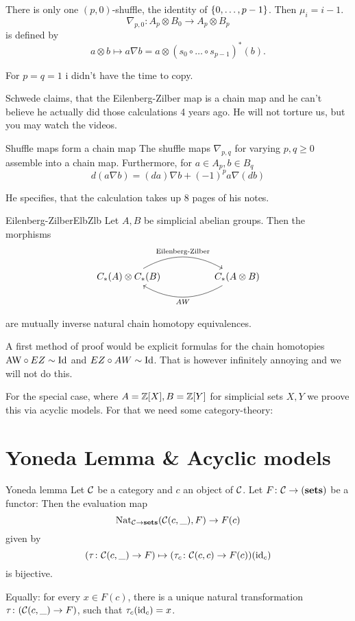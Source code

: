 \documentclass[language=english]{TemplateLecture}
\begin{document}
\begin{example}
    There is only one \((p,0)\)-shuffle, the identity of \(\{0, \dots, p-1\}\). Then \(\mu_i = i-1\).
    \[\nabla_{p,0}\colon A_p \otimes B_0 \to A_p \otimes B_p\]
    is defined by
    \[a\otimes b \mapsto a\nabla b = a \otimes (s_0 \circ \dots \circ s_{p-1})^*(b).\]

    For \(p = q = 1\) i didn't have the time to copy.
\end{example}

Schwede claims, that the Eilenberg-Zilber map is a chain map and he can't believe he actually did those calculations 4 years ago. He will not torture us, but you may watch the videos.

\begin{thm}{Shuffle maps form a chain map}{}
    The shuffle maps \(\nabla_{p,q}\) for varying \(p,q \geq 0\) assemble into a chain map. Furthermore, for \(a \in A_p, b \in B_q\)
    \[d(a\nabla b) = (da) \nabla b + (-1)^p a \nabla (db)\]
\end{thm}

He specifies, that the calculation takes up 8 pages of his notes.


\begin{thm}{Eilenberg-Zilber}{ElbZlb}
    Let \(A,B\) be simplicial abelian groups. Then the morphisms
    \[\begin{tikzcd}
        C_*(A) \otimes C_*(B) \ar[rr, bend left, "\text{Eilenberg-Zilber}"] && C_*(A\otimes B) \ar[ll, bend left, "AW"]
    \end{tikzcd}\]

    are mutually inverse natural chain homotopy equivalences.
\end{thm}

A first method of proof would be explicit formulas for the chain homotopies \(\text{AW} \circ EZ \sim \operatorname{Id}\) and \(EZ \circ AW \sim \operatorname{Id}\). That is however infinitely annoying and we will not do this.

For the special case, where \(A = \mathbb{Z}[X], B= \mathbb{Z}[Y]\) for simplicial sets \(X,Y\) we proove this via acyclic models. For that we need some category-theory:

\section{Yoneda Lemma \& Acyclic models}

\begin{thm}{Yoneda lemma}{}
    Let \(\mathcal{C}\) be a category and \(c\) an object of \(\mathcal{C}\). Let \(F\colon \mathcal{C} \to (\mathbf{sets})\) be a functor: Then the evaluation map
    \[\mathrm{Nat}_{\mathcal{C} \to \mathbf{sets}}(\mathcal{C}(c,\_), F) \to F(c)\]
    given by
    \[(\tau\colon \mathcal{C}(c,\_) \to F) \mapsto (\tau_c\colon \mathcal{C}(c,c)\to F(c))(\operatorname{id}_c)\]
    is bijective.

    Equally: for every \(x \in F(c)\), there is a unique natural transformation \(\tau\colon (\mathcal{C}(c, \_) \to F)\), such that \(\tau_c(\operatorname{id}_c) = x\).
\end{thm}
\end{document}

